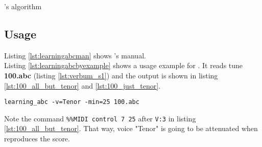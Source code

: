 \begin{algorithm}[h]
  \Return{}
  \caption{\learningabc{}'s algorithm}
  \label{alg:learningabc}
\end{algorithm}

\subsection*{Usage}

Listing \ref{lst:learningabcman} shows \learningabc{}'s manual.\\



Listing \ref{lst:learningabcbyexample} shows a usage example for \learningabc{}. It reads tune
\textbf{100.abc} (listing \ref{lst:verbum_s1}) and the output is shown in listing
\ref{lst:100_all_but_tenor} and \ref{lst:100_just_tenor}.\\

\begin{lstlisting}[caption={\learningabc{} by example},label={lst:learningabcbyexample},captionpos=t,abovecaptionskip=-\medskipamount]
learning_abc -v=Tenor -min=25 100.abc
\end{lstlisting}

\begin{center}
  \begin{minipage}{.49\textwidth}
    
  \end{minipage}
  \hfill
  \begin{minipage}{.49\textwidth}
    
  \end{minipage}
\end{center}

Note the \midi{} command \texttt{\%\%MIDI control 7 25} after \texttt{V:3} in listing
\ref{lst:100_all_but_tenor}. That way, voice "Tenor" is going to be attenuated when \abctomidi{}
reproduces the score.\\


